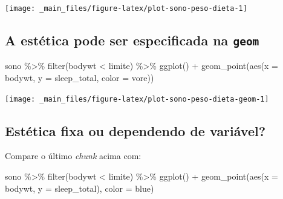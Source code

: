 \documentclass[
  12pt]{report}
\newenvironment{Shaded}{\begin{snugshade}}{\end{snugshade}}
\newcommand{\AttributeTok}[1]{\textcolor[rgb]{0.77,0.63,0.00}{#1}}
\newcommand{\FunctionTok}[1]{\textcolor[rgb]{0.00,0.00,0.00}{#1}}
\newcommand{\NormalTok}[1]{#1}
\newcommand{\SpecialCharTok}[1]{\textcolor[rgb]{0.00,0.00,0.00}{#1}}
\newcommand{\StringTok}[1]{\textcolor[rgb]{0.31,0.60,0.02}{#1}}
\begin{document}
\begin{center}\texttt{[image: \_main\_files/figure-latex/plot-sono-peso-dieta-1]} \end{center}

\hypertarget{a-estuxe9tica-pode-ser-especificada-na-geom}{%
\subsection{\texorpdfstring{A estética pode ser especificada na \texttt{geom}}{A estética pode ser especificada na geom}}\label{a-estuxe9tica-pode-ser-especificada-na-geom}}

\begin{Shaded}
\begin{Highlighting}[]
\NormalTok{sono }\SpecialCharTok{\%\textgreater{}\%} 
  \FunctionTok{filter}\NormalTok{(bodywt }\SpecialCharTok{\textless{}}\NormalTok{ limite) }\SpecialCharTok{\%\textgreater{}\%} 
  \FunctionTok{ggplot}\NormalTok{() }\SpecialCharTok{+}
    \FunctionTok{geom\_point}\NormalTok{(}\FunctionTok{aes}\NormalTok{(}\AttributeTok{x =}\NormalTok{ bodywt, }\AttributeTok{y =}\NormalTok{ sleep\_total, }\AttributeTok{color =}\NormalTok{ vore))}
\end{Highlighting}
\end{Shaded}

\begin{center}\texttt{[image: \_main\_files/figure-latex/plot-sono-peso-dieta-geom-1]} \end{center}

\hypertarget{estuxe9tica-fixa-ou-dependendo-de-variuxe1vel}{%
\subsection{Estética fixa ou dependendo de variável?}\label{estuxe9tica-fixa-ou-dependendo-de-variuxe1vel}}

Compare o último \emph{chunk} acima com:

\begin{Shaded}
\begin{Highlighting}[]
\NormalTok{sono }\SpecialCharTok{\%\textgreater{}\%} 
  \FunctionTok{filter}\NormalTok{(bodywt }\SpecialCharTok{\textless{}}\NormalTok{ limite) }\SpecialCharTok{\%\textgreater{}\%} 
  \FunctionTok{ggplot}\NormalTok{() }\SpecialCharTok{+}
    \FunctionTok{geom\_point}\NormalTok{(}\FunctionTok{aes}\NormalTok{(}\AttributeTok{x =}\NormalTok{ bodywt, }\AttributeTok{y =}\NormalTok{ sleep\_total), }\AttributeTok{color =} \StringTok{\textquotesingle{}blue\textquotesingle{}}\NormalTok{)}
\end{Highlighting}
\end{Shaded}
\end{document}
